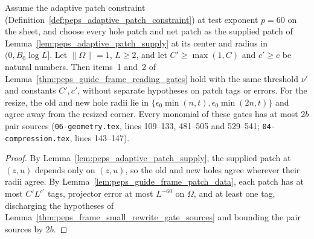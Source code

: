 \begin{lemma}
    \label{thm:peps_guide_frame_supplied_gates}
    \leanok
    Assume the adaptive patch constraint (Definition~\ref{def:peps_adaptive_patch_constraint}) at test exponent $p=60$ on the sheet,
    and choose every hole patch and net patch as the supplied patch of Lemma~\ref{lem:peps_adaptive_patch_supply} at
    its center and radius in $(0,B_0\log L]$. Let
    $\lVert\Omega\rVert=1$, $L\ge2$, and let $C'\ge\max(1,C)$ and $c'\ge c$ be
    natural numbers. Then items~1 and~2 of
    Lemma~\ref{thm:peps_guide_frame_reading_gates} hold with the same
    threshold $\nu'$ and constants $C',c'$, without separate hypotheses on patch tags or errors. For the resize, the old and new hole
    radii lie in $\{\epsilon_0\min(n,t),\epsilon_0\min(2n,t)\}$ and
    agree away from the resized corner. Every monomial of these gates has at most
    $2b$ pair sources (\texttt{06-geometry.tex}, lines 109--133, 481--505 and
    529--541; \texttt{04-compression.tex}, lines 143--147).
\end{lemma}

\begin{proof}\leanok
    By Lemma~\ref{lem:peps_adaptive_patch_supply}, the supplied patch at $(z,u)$ depends only on $(z,u)$, so
    the old and new holes agree wherever their radii agree. By Lemma~\ref{lem:peps_guide_frame_patch_data}, each patch has at most
    $C'L^{c'}$ tags, projector error at most $L^{-60}$ on $\Omega$, and at least one tag, discharging the hypotheses of
    Lemma~\ref{thm:peps_frame_small_rewrite_gate_sources} and bounding the pair sources by $2b$.
\end{proof}

